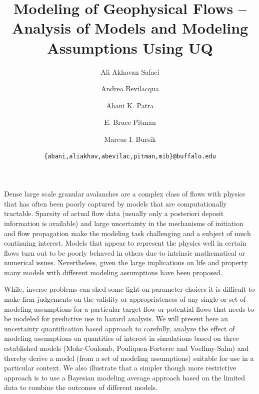 \documentclass{article}
\begin{document}
\title{\bf Modeling of Geophysical Flows -- Analysis of Models and Modeling Assumptions Using UQ}
\author[1]{Ali Akhavan Safaei}
\author[2]{Andrea Bevilacqua}
\author[1,3]{Abani K. Patra}
\author[4]{E. Bruce Pitman}
\author[2]{Marcus I. Bursik}


\date{\texttt{\{abani,aliakhav,abevilac,pitman,mib\}@buffalo.edu}}


\maketitle

\abstract
Dense large scale granular avalanches are a complex class of flows with physics that has often been poorly captured by models that are computationally tractable. Sparsity of actual flow data (usually only a posteriori  deposit information is available) and large uncertainty in the mechanisms of initiation and flow propagation make the modeling task challenging and a subject of much continuing interest. Models that appear to represent the physics well in certain flows turn out to be poorly behaved in others due to intrinsic mathematical or numerical issues. Nevertheless, given the large implications on life and property many models with different modeling assumptions have been proposed.

While, inverse problems can shed some light on parameter choices it is difficult to make firm judgements on the validity or appropriateness of any single or set of modeling assumptions for a particular target flow or potential flows that needs to be modeled for predictive use in hazard analysis. We will present here an uncertainty quantification  based approach to carefully, analyze the effect of modeling assumptions on quantities of interest in simulations based on three established models (Mohr-Coulomb, Pouliquen-Forterre and Voellmy-Salm) and thereby derive a model (from a set of modeling assumptions) suitable for use in a particular context. We also illustrate that a simpler though more restrictive approach is to use a Bayesian modeling average approach based on the limited data to combine the outcomes of different models.
\end{document}
